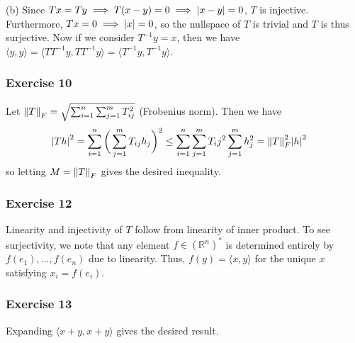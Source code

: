 (b) Since $Tx = Ty \implies T(x - y) = 0 \implies \abs{x - y} = 0$, $T$ is injective. Furthermore,  
$Tx = 0 \implies \abs{x} = 0$, so the nullspace of $T$ is trivial and $T$ is thus surjective. Now if we
consider $T^{-1} y = x$, then we have $\langle y, y \rangle = \langle TT^{-1} y, TT^{-1} y \rangle = \langle T^{-1} y, T^{-1} y \rangle$.

\subsubsection{Exercise 10}
Let $\norm{T}_F = \sqrt{\sum_{i = 1}^n \sum_{j = 1}^m T_{ij}^2}$ (Frobenius norm). Then we have
\begin{align*}
        \abs{T h}^2 = \sum_{i = 1}^n \bigg(\sum_{j = 1}^m T_{ij} h_j\bigg)^2 &\leq \sum_{i = 1}^n \sum_{j = 1}^m T_ij^2 \sum_{j = 1}^m h_j^2 = \norm{T}_F^2 \abs{h}^2
\end{align*}
so letting $M = \norm{T}_F$ gives the desired inequality.

\subsubsection{Exercise 12}
Linearity and injectivity of $T$ follow from linearity of inner product. To see surjectivity, we note that 
any element $f \in (\mathbb{R}^n)^*$ is determined entirely by $f(e_1), ..., f(e_n)$ due to linearity. Thus,
$f(y) = \langle x, y \rangle$ for the unique $x$ satisfying $x_i = f(e_i)$.

\subsubsection{Exercise 13}
Expanding $\langle x + y, x + y \rangle$ gives the desired result.

